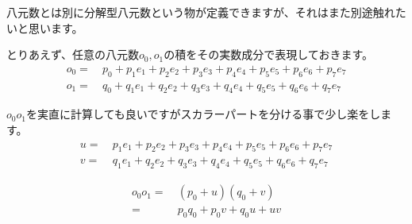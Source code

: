 \documentclass[a4paper,12pt,notitlepage]{jsreport}
\begin{document}
八元数とは別に分解型八元数という物が定義できますが、それはまた別途触れたいと思います。

とりあえず、任意の八元数$o_0,o_1$の積をその実数成分で表現しておきます。
\begin{equation}
  \begin{split}
    o_0=~&p_0+p_1e_1+p_2e_2+p_3e_3+p_4e_4+p_5e_5+p_6e_6+p_7e_7\\
    o_1=~&q_0+q_1e_1+q_2e_2+q_3e_3+q_4e_4+q_5e_5+q_6e_6+q_7e_7
  \end{split}
\end{equation}

$o_0o_1$を実直に計算しても良いですがスカラーパートを分ける事で少し楽をします。
\begin{equation}
  \begin{split}
    u=~&p_1e_1+p_2e_2+p_3e_3+p_4e_4+p_5e_5+p_6e_6+p_7e_7\\
    v=~&q_1e_1+q_2e_2+q_3e_3+q_4e_4+q_5e_5+q_6e_6+q_7e_7
  \end{split}
\end{equation}

\begin{equation}
  \begin{split}
    o_0o_1=~&(p_0+u)(q_0+v)\\
    =~&p_0q_0+p_0v+q_0u+uv
  \end{split}
\end{equation}
\end{document}
